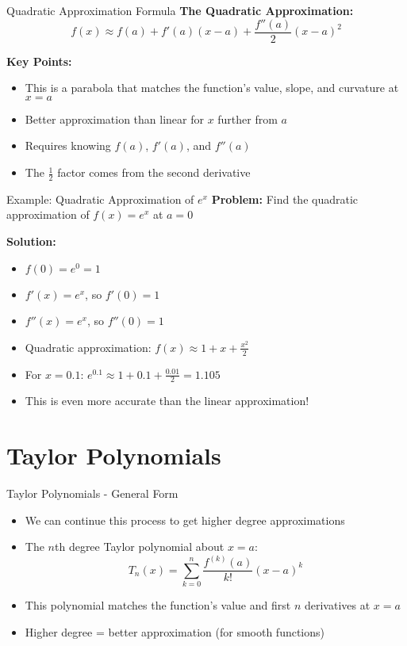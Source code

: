 \documentclass[aspectratio=169]{beamer}
\begin{document}
\begin{frame}{Quadratic Approximation Formula}
\textbf{The Quadratic Approximation:}
\[f(x) \approx f(a) + f'(a)(x-a) + \frac{f''(a)}{2}(x-a)^2\]

\textbf{Key Points:}
\begin{itemize}
    \item This is a parabola that matches the function's value, slope, and curvature at $x = a$
    \item Better approximation than linear for $x$ further from $a$
    \item Requires knowing $f(a)$, $f'(a)$, and $f''(a)$
    \item The $\frac{1}{2}$ factor comes from the second derivative
\end{itemize}
\end{frame}

\begin{frame}{Example: Quadratic Approximation of $e^x$}
\textbf{Problem:} Find the quadratic approximation of $f(x) = e^x$ at $a = 0$

\textbf{Solution:}
\begin{itemize}
    \item $f(0) = e^0 = 1$
    \item $f'(x) = e^x$, so $f'(0) = 1$
    \item $f''(x) = e^x$, so $f''(0) = 1$
    \item Quadratic approximation: $f(x) \approx 1 + x + \frac{x^2}{2}$
    \item For $x = 0.1$: $e^{0.1} \approx 1 + 0.1 + \frac{0.01}{2} = 1.105$
    \item This is even more accurate than the linear approximation!
\end{itemize}
\end{frame}

\section{Taylor Polynomials}

\begin{frame}{Taylor Polynomials - General Form}
\begin{itemize}
    \item We can continue this process to get higher degree approximations
    \item The $n$th degree Taylor polynomial about $x = a$:
    \[T_n(x) = \sum_{k=0}^{n} \frac{f^{(k)}(a)}{k!}(x-a)^k\]
    \item This polynomial matches the function's value and first $n$ derivatives at $x = a$
    \item Higher degree = better approximation (for smooth functions)
\end{itemize}
\end{frame}
\end{document}
